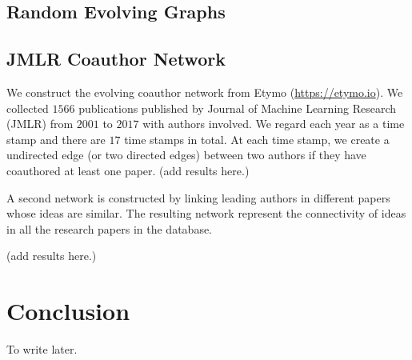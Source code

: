 \documentclass[12pt]{article}
\theoremstyle{definition}
\begin{document}
\subsection{Random Evolving Graphs}
\label{sec:random}



\subsection{JMLR Coauthor Network}
\label{sec:jmlr-coauth-netw}


We construct the evolving coauthor network from Etymo (\url{https://etymo.io}).
We collected $1566$ publications published by Journal of Machine Learning Research (JMLR) from $2001$ to $2017$ with authors involved. We regard each year
as a time stamp and there are $17$ time stamps in total. At each time stamp, we
create a undirected edge (or two directed edges) between two authors if they have coauthored at least one paper.
(add results here.)

A second network is constructed by linking leading authors in different papers whose
ideas are similar. The resulting network represent the connectivity of ideas in all the research papers in the database.

(add results here.)

%
%



\section{Conclusion}
\label{sec:conclusion}

To write later.



\end{document}
